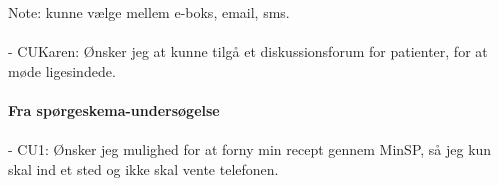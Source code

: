 Note: kunne vælge mellem e-boks, email, sms.\\
\\
- CUKaren: Ønsker jeg at kunne tilgå et diskussionsforum for patienter, for at møde ligesindede.\\
\\
\textbf{Fra spørgeskema-undersøgelse}\\\\
- CU1: Ønsker jeg mulighed for at forny min recept gennem MinSP, så jeg kun skal ind et sted og ikke skal vente telefonen.\\
%
